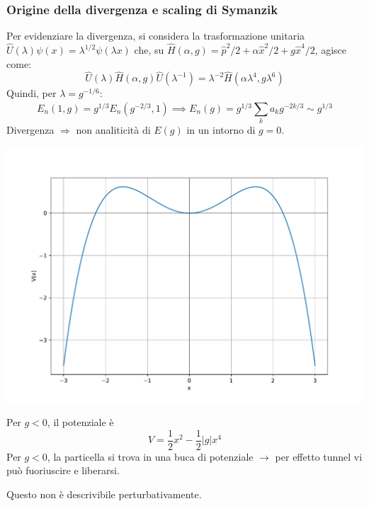 \documentclass[10pt]{beamer}
\begin{document}
  \begin{frame}
\frametitle{Origine della divergenza e scaling di Symanzik}

  Per evidenziare la divergenza, si considera la trasformazione unitaria $\hat{U}(\lambda ) \psi (x) = \lambda ^{1 / 2} \psi (\lambda x)$ che, su $\hat{H}(\alpha ,g) = \hat{p}^2 / 2 + \alpha  \hat{x}^2 / 2 + g \hat{x}^4 / 2$, agisce come:
  \begin{equation*}
  	\hat{U}(\lambda ) \hat{H}(\alpha ,g) \hat{U}(\lambda ^{-1} ) = \lambda ^{-2} \hat{H}(\alpha  \lambda ^4, g \lambda ^6)
  \end{equation*}
  Quindi, per $\lambda  = g^{- 1 / 6} $:
  \[
  E_n(1,g) = g^{1 / 3} E_n(g^{-2 / 3} , 1) \implies E_n(g) = g^{1 /3 }  \sum_{k}^{} a_k g^{-2k/3} \sim g^{1 / 3} 
\] 
  Divergenza $\Rightarrow $ non analiticit\`a di $E(g)$ in un intorno di $g=0$. 
  \begin{minipage}{0.45\textwidth}
    	\centering
    	\includegraphics[width=\columnwidth]{f1.pdf}
  \end{minipage}%
  \hfill
  \begin{minipage}{0.5\textwidth}
Per $g<0$, il potenziale \`e
\begin{equation*}
	V= \frac{1}{2}x^2 - \frac{1}{2}\lvert g \rvert x^4
\end{equation*}
	  Per $g<0$, la particella si trova in una buca di potenziale $\to$ per effetto tunnel vi pu\`o fuoriuscire e liberarsi.

	  Questo non \`e descrivibile perturbativamente.
  \end{minipage}
{\hspace{2cm}}
  \end{frame} 
\end{document}
